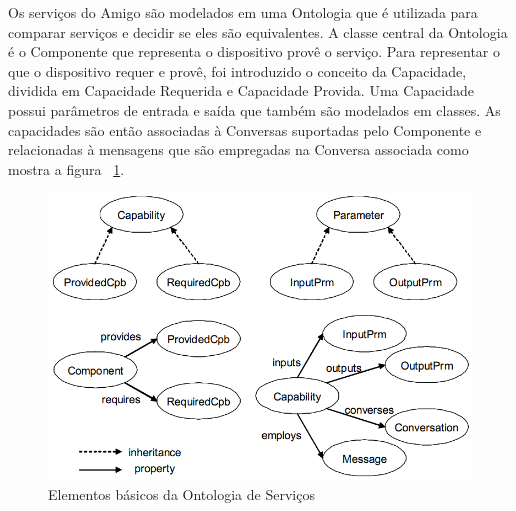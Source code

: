 Os serviços do Amigo são modelados em uma Ontologia que é utilizada para comparar serviços e decidir se eles são equivalentes. A classe central da Ontologia é o Componente que representa o dispositivo provê o serviço. Para representar o que o dispositivo requer e provê, foi introduzido o conceito da Capacidade, dividida em Capacidade Requerida e Capacidade Provida. Uma Capacidade possui parâmetros de entrada e saída que também são modelados em classes. As capacidades são então associadas à Conversas suportadas pelo Componente e relacionadas à mensagens que são empregadas na Conversa associada como mostra a figura ~\ref{fig:amigoServiceOntology}.

\begin{figure}[ht]
\center
\includegraphics[scale=0.5]{imagens/amigo-ontology}
\caption{Elementos básicos da Ontologia de Serviços~\cite{amigoCore}}
\label{fig:amigoServiceOntology}
\end{figure}

